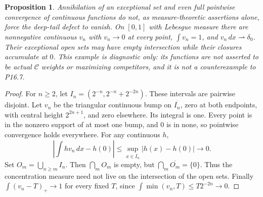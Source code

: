 \documentclass[11pt]{article}
\newtheorem{proposition}[theorem]{Proposition}
\newcommand{\C}{\mathcal C}
\begin{document}
\begin{proposition}\label{fresh:diagnostic}
Annihilation of an exceptional set and even full pointwise convergence
of continuous functions do not, as measure-theoretic assertions alone,
force the deep-tail defect to vanish. On $[0,1]$ with Lebesgue measure
there are nonnegative continuous $v_n$ with $v_n\to0$ at every point,
$\int v_n=1$, and $v_n\,dx\rightharpoonup\delta_0$.
Their exceptional open sets may have empty intersection while their
closures accumulate at $0$. This example is diagnostic only: its
functions are not asserted to be actual $\C$ weights or maximizing
competitors, and it is not a counterexample to P16.7.
\end{proposition}
\begin{proof}
For $n\ge2$, let $I_n=(2^{-n},2^{-n}+2^{-2n})$. These intervals are
pairwise disjoint. Let $v_n$ be the triangular continuous bump on
$\overline{I_n}$, zero at both endpoints, with central height
$2^{2n+1}$, and zero elsewhere. Its integral is one. Every point is
in the nonzero support of at most one bump, and $0$ is in none, so
pointwise convergence holds everywhere. For any continuous $h$,
\[
 \left|\int h v_n\,dx-h(0)\right|
 \le\sup_{x\in\overline{I_n}}|h(x)-h(0)|\to0.
\]
Set $O_m=\bigcup_{n\ge m}I_n$. Then $\bigcap_m O_m$ is empty,
but $\bigcap_m\overline{O_m}=\{0\}$. Thus the concentration
measure need not live on the intersection of the open sets. Finally
$\int(v_n-T)_+\to1$ for every fixed $T$, since
$\int\min(v_n,T)\le T2^{-2n}\to0$.
\end{proof}
\end{document}
